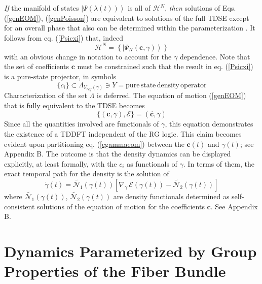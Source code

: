 \documentclass[aps,preprint]{revtex4}%
\begin{document}
\emph{If} the manifold of states $\left|  \Psi(\lambda(t))\right\rangle $ is
all of $\mathcal{H}^{N}$, \emph{then} solutions of Eqs. (\ref{genEOM}),
(\ref{genPoisson}) are equivalent to solutions of the full TDSE except for an
overall phase that also can be determined within the parameterization
\cite{KramSar,BLW94}. It follows from eq. (\ref{Psicxi}) that, indeed
\begin{equation}
\mathcal{H}^{N}=\left\{  \left|  \Psi_{N}(\mathbf{c},\gamma)\right\rangle
\right\}
\end{equation}
with an obvious change in notation to account for the $\gamma$ dependence.
Note that the set of coefficients $\mathbf{c}$ must be constrained such that
the result in eq. (\ref{Psicxi}) is a pure-state projector, in symbols
\begin{equation}
\{c_{i}\}\subset\Lambda_{Y_{ref}(\gamma)}\ni Y=\mathrm{pure \, state\, density
\,operator} \label{posconstraint}%
\end{equation}
Characterization of the set $\Lambda$ is deferred. The equation of motion
(\ref{genEOM}) that is fully equivalent to the TDSE becomes
\begin{equation}
\{(\mathbf{c,}\gamma),\mathcal{E}\}=(\dot{\mathbf{c,}}\dot{\gamma})
\label{cgammaeom}%
\end{equation}
Since all the quantities involved are functionals of $\gamma$, this equation
demonstrates the existence of a TDDFT independent of the RG logic. This claim
becomes evident upon partitioning eq. (\ref{cgammaeom}) between the
$\mathbf{c}(t)$ and $\gamma(t)$; see Appendix B. The outcome is that the
density dynamics can be displayed explicitly, at least formally, with the
$c_{i}$ as functionals of $\gamma$. In terms of them, the exact temporal path
for the density is the solution of
\begin{equation}
\dot{\gamma}(t)=\tilde{\mathcal{N}_{1}}(\gamma(t))\left[  \nabla_{\gamma
}\,\mathcal{E}(\gamma(t))-\tilde{\mathcal{N}_{2}}(\gamma(t))\right]
\label{gammadot1}%
\end{equation}
where $\tilde{\mathcal{N}_{1}}(\gamma(t))$, $\tilde{\mathcal{N}_{2}}%
(\gamma(t))$ are density functionals determined as self-consistent solutions
of the equation of motion for the coefficients $\mathbf{c}$. See Appendix B.

\section{Dynamics Parameterized by Group Properties of the Fiber Bundle}
\end{document}
